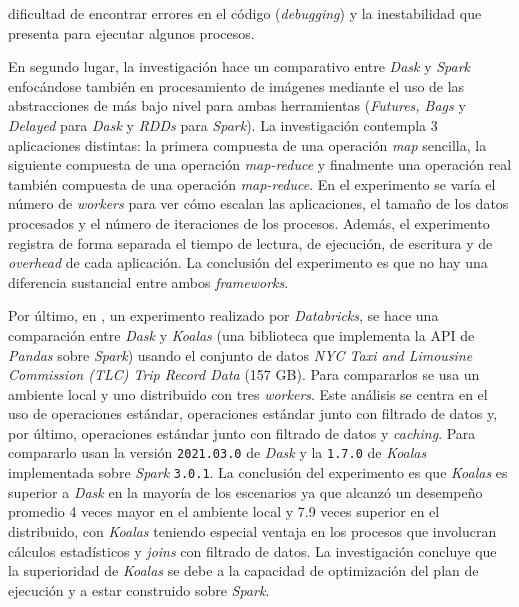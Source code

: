 dificultad de encontrar errores en el código (\textit{debugging}) y la inestabilidad que presenta para ejecutar algunos procesos.

En segundo lugar, la investigación \cite{dask-spark-neuroimaging} hace un comparativo entre \textit{Dask} y \textit{Spark} enfocándose también en procesamiento de imágenes mediante el uso de las abstracciones de más bajo nivel para ambas herramientas (\textit{Futures, Bags} y \textit{Delayed} para \textit{Dask} y \textit{RDDs} para \textit{Spark}). La investigación contempla 3 aplicaciones distintas: la primera compuesta de una operación \textit{map} sencilla, la siguiente compuesta de una operación \textit{map-reduce} y finalmente una operación real también compuesta de una operación \textit{map-reduce}. En el experimento se varía el número de \textit{workers} para ver cómo escalan las aplicaciones, el tamaño de los datos procesados y el número de iteraciones de los procesos. Además, el experimento registra de forma separada el tiempo de lectura, de ejecución, de escritura y de \textit{overhead} de cada aplicación. La conclusión del experimento es que no hay una diferencia sustancial entre ambos \textit{frameworks}.

Por último, en \cite{koalas-dask}, un experimento realizado por \textit{Databricks}, se hace una comparación entre \textit{Dask} y \textit{Koalas} (una biblioteca que implementa la API de \textit{Pandas} sobre \textit{Spark}) usando el conjunto de datos \textit{NYC Taxi and Limousine Commission (TLC) Trip Record Data} (157 GB). Para compararlos se usa un ambiente local y uno distribuido con tres \textit{workers}. Este análisis se centra en el uso de operaciones estándar, operaciones estándar junto con filtrado de datos y, por último, operaciones estándar junto con filtrado de datos y \textit{caching}. Para compararlo usan la versión \texttt{2021.03.0} de \textit{Dask} y la \texttt{1.7.0} de \textit{Koalas} implementada sobre \textit{Spark} \texttt{3.0.1}. La conclusión del experimento es que \textit{Koalas} es superior a \textit{Dask} en la mayoría de los escenarios ya que alcanzó un desempeño promedio 4 veces mayor en el ambiente local y 7.9 veces superior en el distribuido, con \textit{Koalas} teniendo especial ventaja en los procesos que involucran cálculos estadísticos y \textit{joins} con filtrado de datos. La investigación concluye que la superioridad de \textit{Koalas} se debe a la capacidad de optimización del plan de ejecución y a estar construido sobre \textit{Spark}.

\newpage

